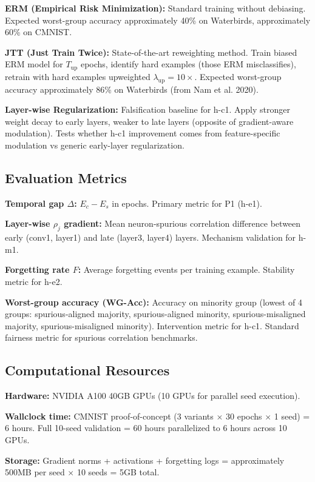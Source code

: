 \textbf{ERM (Empirical Risk Minimization):} Standard training without debiasing. Expected worst-group accuracy approximately 40\% on Waterbirds, approximately 60\% on CMNIST.

\textbf{JTT (Just Train Twice):} State-of-the-art reweighting method. Train biased ERM model for $T_{\text{up}}$ epochs, identify hard examples (those ERM misclassifies), retrain with hard examples upweighted $\lambda_{\text{up}}=10\times$. Expected worst-group accuracy approximately 86\% on Waterbirds (from Nam et al. 2020).

\textbf{Layer-wise Regularization:} Falsification baseline for h-c1. Apply stronger weight decay to early layers, weaker to late layers (opposite of gradient-aware modulation). Tests whether h-c1 improvement comes from feature-specific modulation vs generic early-layer regularization.

\subsection{Evaluation Metrics}

\textbf{Temporal gap $\Delta$:} $E_c - E_s$ in epochs. Primary metric for P1 (h-e1).

\textbf{Layer-wise $\rho_j$ gradient:} Mean neuron-spurious correlation difference between early (conv1, layer1) and late (layer3, layer4) layers. Mechanism validation for h-m1.

\textbf{Forgetting rate $F$:} Average forgetting events per training example. Stability metric for h-e2.

\textbf{Worst-group accuracy (WG-Acc):} Accuracy on minority group (lowest of 4 groups: spurious-aligned majority, spurious-aligned minority, spurious-misaligned majority, spurious-misaligned minority). Intervention metric for h-c1. Standard fairness metric for spurious correlation benchmarks.

\subsection{Computational Resources}

\textbf{Hardware:} NVIDIA A100 40GB GPUs (10 GPUs for parallel seed execution).

\textbf{Wallclock time:} CMNIST proof-of-concept (3 variants $\times$ 30 epochs $\times$ 1 seed) = 6 hours. Full 10-seed validation = 60 hours parallelized to 6 hours across 10 GPUs.

\textbf{Storage:} Gradient norms + activations + forgetting logs = approximately 500MB per seed $\times$ 10 seeds = 5GB total.
